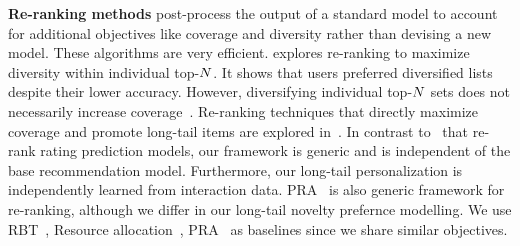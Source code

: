 \vspace{2mm}
\noindent \textbf{Re-ranking methods}  post-process the output of a standard model to account for additional objectives like coverage and diversity rather than devising a new model. These algorithms are very efficient. 
\cite{ziegler2005improving} explores re-ranking to maximize diversity within individual top-$N$. It shows that users preferred diversified lists despite their lower accuracy. However, diversifying individual top-$N$ sets does not necessarily increase  coverage~\cite{jambor2010optimizing,niemann2013new}. %
Re-ranking techniques that directly maximize coverage  and promote long-tail items are explored in~\cite{adomavicius2011maximizing,adomavicius2012improving,ho2014likes,jugovac2017efficient}. In contrast to~\cite{adomavicius2011maximizing,adomavicius2012improving,ho2014likes} that re-rank rating prediction models, our framework is generic and is independent of the base recommendation  model. Furthermore,  our long-tail  personalization is independently learned from interaction data.  PRA~\cite{jugovac2017efficient} is also generic framework for re-ranking, although we differ in our long-tail novelty prefernce modelling. We use RBT~\cite{adomavicius2012improving}, Resource allocation~\cite{ho2014likes}, PRA~\cite{jugovac2017efficient} as baselines since we share similar objectives.

